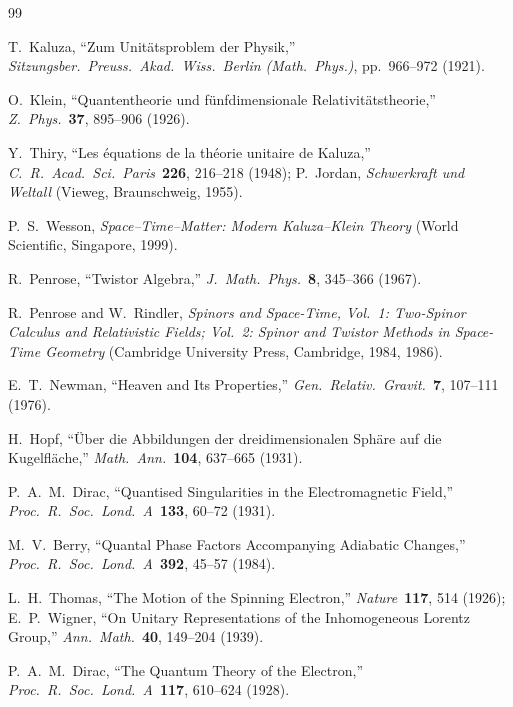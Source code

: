 \documentclass[11pt,a4paper]{article}
\begin{document}
\begin{thebibliography}{99}
\small

T.~Kaluza, ``Zum Unit\"atsproblem der Physik,'' \emph{Sitzungsber.\ Preuss.\ Akad.\ Wiss.\ Berlin (Math.\ Phys.)}, pp.\ 966--972 (1921).

O.~Klein, ``Quantentheorie und f\"unfdimensionale Relativit\"atstheorie,'' \emph{Z.\ Phys.}\ \textbf{37}, 895--906 (1926).

Y.~Thiry, ``Les \'equations de la th\'eorie unitaire de Kaluza,'' \emph{C.\ R.\ Acad.\ Sci.\ Paris}\ \textbf{226}, 216--218 (1948); P.~Jordan, \emph{Schwerkraft und Weltall} (Vieweg, Braunschweig, 1955).

P.~S.~Wesson, \emph{Space--Time--Matter: Modern Kaluza--Klein Theory} (World Scientific, Singapore, 1999).

R.~Penrose, ``Twistor Algebra,'' \emph{J.\ Math.\ Phys.}\ \textbf{8}, 345--366 (1967).

R.~Penrose and W.~Rindler, \emph{Spinors and Space-Time, Vol.\ 1: Two-Spinor Calculus and Relativistic Fields; Vol.\ 2: Spinor and Twistor Methods in Space-Time Geometry} (Cambridge University Press, Cambridge, 1984, 1986).

E.~T.~Newman, ``Heaven and Its Properties,'' \emph{Gen.\ Relativ.\ Gravit.}\ \textbf{7}, 107--111 (1976).

H.~Hopf, ``\"Uber die Abbildungen der dreidimensionalen Sph\"are auf die Kugelfl\"ache,'' \emph{Math.\ Ann.}\ \textbf{104}, 637--665 (1931).

P.~A.~M.~Dirac, ``Quantised Singularities in the Electromagnetic Field,'' \emph{Proc.\ R.\ Soc.\ Lond.\ A}\ \textbf{133}, 60--72 (1931).

M.~V.~Berry, ``Quantal Phase Factors Accompanying Adiabatic Changes,'' \emph{Proc.\ R.\ Soc.\ Lond.\ A}\ \textbf{392}, 45--57 (1984).

L.~H.~Thomas, ``The Motion of the Spinning Electron,'' \emph{Nature}\ \textbf{117}, 514 (1926); E.~P.~Wigner, ``On Unitary Representations of the Inhomogeneous Lorentz Group,'' \emph{Ann.\ Math.}\ \textbf{40}, 149--204 (1939).

P.~A.~M.~Dirac, ``The Quantum Theory of the Electron,'' \emph{Proc.\ R.\ Soc.\ Lond.\ A}\ \textbf{117}, 610--624 (1928).


\end{thebibliography}
\end{document}
